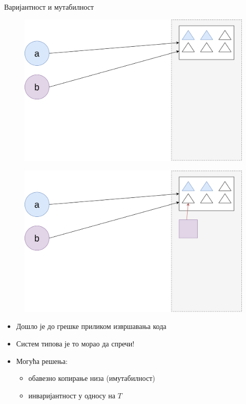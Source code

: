 \documentclass[xcolor=table]{beamer}
\begin{document}
\begin{frame}[allowframebreaks]{Варијантност и мутабилност}
        \framebreak
        
        \begin{figure}
            \centering
            \includegraphics[height=0.7\textheight,keepaspectratio]{images/arr1.png}
        \end{figure}
        
        \framebreak
        
        \begin{figure}
            \centering
            \includegraphics[height=0.7\textheight,keepaspectratio]{images/arr2.png}
        \end{figure}
        
        \framebreak
        
        \begin{itemize}
            \item Дошло је до грешке приликом извршавања кода
            \item Систем типова је то морао да спречи!
            \item Могућа решења:
            \begin{itemize}
                \item обавезно копирање низа (имутабилност)
                \item инваријантност у односу на \begin{math}T\end{math}
            \end{itemize}
        \end{itemize}
        

\end{frame}
\end{document}
